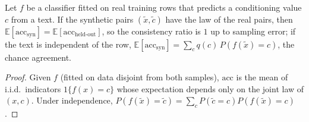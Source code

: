 \begin{proposition}\label{prop:txconsist}
Let $f$ be a classifier fitted on real training rows that predicts a conditioning value $c$ from a text. If the
synthetic pairs $(\tilde x,\tilde c)$ have the law of the real pairs, then
$\mathbb E[\mathrm{acc}_{\mathrm{syn}}]=\mathbb E[\mathrm{acc}_{\mathrm{held\text{-}out}}]$, so the consistency ratio is $1$
up to sampling error; if the text is independent of the row, $\mathbb E[\mathrm{acc}_{\mathrm{syn}}]=\sum_c
q(c)\,P(f(\tilde x)=c)$, the chance agreement.
\end{proposition}
\begin{proof}
Given $f$ (fitted on data disjoint from both samples), $\mathrm{acc}$ is the mean of i.i.d.\ indicators
$1\{f(x)=c\}$ whose expectation depends only on the joint law of $(x,c)$. Under independence,
$P(f(\tilde x)=\tilde c)=\sum_cP(\tilde c=c)P(f(\tilde x)=c)$.
\end{proof}
\setcounter{proposition}{\value{savedproptx}}
